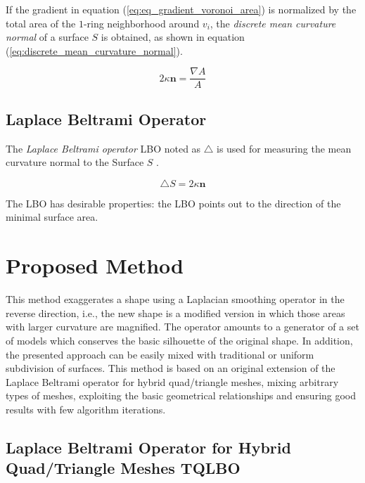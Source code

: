 \documentclass[10pt, conference]{IEEEtran}
\begin{document}
If the gradient in equation (\ref{eq:eq_gradient_voronoi_area}) is
normalized by the total area of the $1$-ring neighborhood around
$v_{i}$, the \textit{discrete mean curvature normal} of a surface
$S$ is obtained, as shown in equation (\ref{eq:discrete_mean_curvature_normal}).

\begin{equation}
2\kappa\mathbf{n}=\frac{\nabla A}{A}\label{eq:discrete_mean_curvature_normal}
\end{equation}



\subsection{Laplace Beltrami Operator}

The \textit{Laplace Beltrami operator} LBO noted as $\triangle$
is used for measuring the mean curvature normal to the Surface $S$
\cite{Pinkall1993}. 

\begin{equation}
\triangle S=2\kappa\mathbf{n}\label{eq:def_LBO}
\end{equation}


The LBO has desirable properties: the LBO points out to the direction
of the minimal surface area.


\section{Proposed Method\label{sec:Proposed-Method}}

This method exaggerates a shape using a Laplacian smoothing operator
in the reverse direction, i.e., the new shape is a modified version
in which those areas with larger curvature are magnified. The operator
amounts to a generator of a set of models which conserves the basic
silhouette of the original shape. In addition, the presented approach
can be easily mixed with traditional or uniform subdivision of surfaces.
This method is based on an original extension of the Laplace Beltrami
operator for hybrid quad/triangle meshes, mixing arbitrary types of
meshes, exploiting the basic geometrical relationships and ensuring good results with few algorithm iterations. 


\subsection{Laplace Beltrami Operator for Hybrid Quad/Triangle Meshes TQLBO\label{sub:Laplace-Beltrami-operator}}
\end{document}

